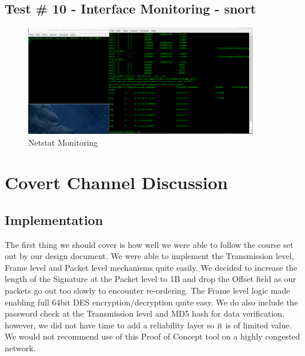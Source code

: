 \documentclass[titlepage]{article}
\begin{document}
\clearpage

\subsection{Test \# 10 - Interface Monitoring - snort}

\begin{figure}[htb]                                                                       
  \begin{center}
    \includegraphics[width=0.9\textwidth]{Pictures/netstat.png}
  \end{center}
  \caption{Netstat Monitoring}
  \label{fig:netstat}
\end{figure}

\clearpage

\section{Covert Channel Discussion}

\subsection{Implementation}

The first thing we should cover is how well we were able to follow the course set out by our design document.  We were able to implement the Transmission level, Frame level and Packet level mechanisms quite easily.  We decided to increase the length of the Signature at the Packet level to 1B and drop the Offset field as our packets go out too slowly to encounter re-ordering.  The Frame level logic made enabling full 64bit DES encryption/decryption quite easy.  We do also include the password check at the Transmission level and MD5 hash for data verification, however, we did not have time to add a reliability layer so it is of limited value. We would not recommend use of this Proof of Concept tool on a highly congested network.
\end{document}
